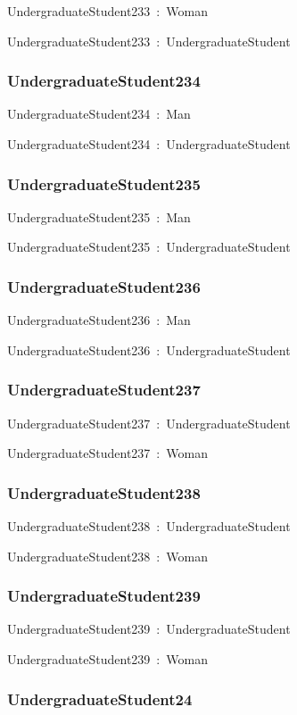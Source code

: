 \documentclass{article}
\begin{document}
UndergraduateStudent233~:~Woman

UndergraduateStudent233~:~UndergraduateStudent

\subsubsection*{UndergraduateStudent234}

UndergraduateStudent234~:~Man

UndergraduateStudent234~:~UndergraduateStudent

\subsubsection*{UndergraduateStudent235}

UndergraduateStudent235~:~Man

UndergraduateStudent235~:~UndergraduateStudent

\subsubsection*{UndergraduateStudent236}

UndergraduateStudent236~:~Man

UndergraduateStudent236~:~UndergraduateStudent

\subsubsection*{UndergraduateStudent237}

UndergraduateStudent237~:~UndergraduateStudent

UndergraduateStudent237~:~Woman

\subsubsection*{UndergraduateStudent238}

UndergraduateStudent238~:~UndergraduateStudent

UndergraduateStudent238~:~Woman

\subsubsection*{UndergraduateStudent239}

UndergraduateStudent239~:~UndergraduateStudent

UndergraduateStudent239~:~Woman

\subsubsection*{UndergraduateStudent24}
\end{document}

